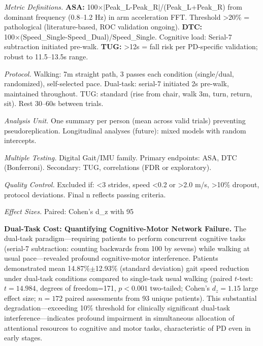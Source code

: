 \documentclass[11pt]{article}
\begin{document}
\begin{table}[ht]
\begin{tablenotes}
\item[\textbf{c}] \textit{Metric Definitions.} \textbf{ASA:} 100×$|$Peak\_L-Peak\_R$|$/(Peak\_L+Peak\_R) from dominant frequency (0.8--1.2 Hz) in arm acceleration FFT. Threshold >20\% = pathological (literature-based, ROC validation ongoing). \textbf{DTC:} 100×(Speed\_Single-Speed\_Dual)/Speed\_Single. Cognitive load: Serial-7 subtraction initiated pre-walk. \textbf{TUG:} >12s = fall risk per PD-specific validation\cite{nocera2013tug}; robust to 11.5--13.5s range.

\item[\textbf{d}] \textit{Protocol.} Walking: 7m straight path, 3 passes each condition (single/dual, randomized), self-selected pace. Dual-task: serial-7 initiated 2s pre-walk, maintained throughout. TUG: standard (rise from chair, walk 3m, turn, return, sit). Rest 30--60s between trials.

\item[\textbf{e}] \textit{Analysis Unit.} One summary per person (mean across valid trials) preventing pseudoreplication. Longitudinal analyses (future): mixed models with random intercepts.

\item[\textbf{f}] \textit{Multiple Testing.} Digital Gait/IMU family. Primary endpoints: ASA, DTC (Bonferroni). Secondary: TUG, correlations (FDR or exploratory).

\item[\textbf{g}] \textit{Quality Control.} Excluded if: <3 strides, speed <0.2 or >2.0 m/s, >10\% dropout, protocol deviations. Final n reflects passing criteria.

\item[\textbf{h}] \textit{Effect Sizes.} Paired: Cohen's d\_z with 95%
\end{tablenotes}
\end{table}

\textbf{Dual-Task Cost: Quantifying Cognitive-Motor Network Failure.} The dual-task paradigm—requiring patients to perform concurrent cognitive tasks (serial-7 subtraction: counting backwards from 100 by sevens) while walking at usual pace—revealed profound cognitive-motor interference. Patients demonstrated mean 14.87\%$\pm$12.93\% (standard deviation) gait speed reduction under dual-task conditions compared to single-task usual walking (paired $t$-test: $t=14.984$, degrees of freedom=171, $p<0.001$ two-tailed; Cohen's $d_z=1.15$ large effect size; $n=172$ paired assessments from 93 unique patients). This substantial degradation—exceeding 10\% threshold for clinically significant dual-task interference—indicates profound impairment in simultaneous allocation of attentional resources to cognitive and motor tasks, characteristic of PD even in early stages.
\end{document}
